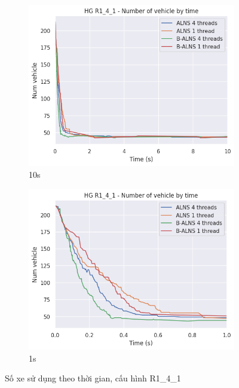 \begin{figure}[H] %
  \label{fig:perf_ct_r1_4}
  \begin{subfigure}{.5\textwidth}
    \centering
    \includegraphics[width=0.9\linewidth]{figures/nv_time_10s_R1_4_1.png}
    \caption{10s}
    \label{fig:perf_ct_r1_4_10s}
  \end{subfigure}%
  \begin{subfigure}{.5\textwidth}
    \centering
    \includegraphics[width=0.9\linewidth]{figures/nv_time_1s_R1_4_1.png}
    \caption{1s}
    \label{fig:perf_ct_r1_4_1s}
  \end{subfigure}
  \caption{Số xe sử dụng theo thời gian, cấu hình R1\_4\_1}
\end{figure}

